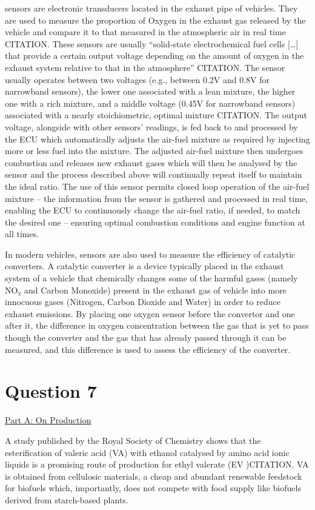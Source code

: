 \documentclass[11pt]{article}
\begin{document}
 sensors are electronic transducers located in the exhaust pipe of vehicles. They are used to measure the proportion of Oxygen in the exhaust gas released by the vehicle and compare it to that measured in the atmospheric air in real time CITATION. These sensors are usually “solid-state electrochemical fuel cells […] that provide a certain output voltage depending on the amount of oxygen in the exhaust system relative to that in the atmosphere” CITATION. The sensor usually operates between two voltages (e.g., between 0.2V and 0.8V for narrowband sensors), the lower one associated with a lean mixture, the higher one with a rich mixture, and a middle voltage (0.45V for narrowband sensors) associated with a nearly stoichiometric, optimal mixture CITATION. The output voltage, alongside with other sensors’ readings, is fed back to and processed by the ECU which automatically adjusts the air-fuel mixture as required by injecting more or less fuel into the mixture. The adjusted air-fuel mixture then undergoes combustion and releases new exhaust gases which will then be analysed by the  sensor and the process described above will continually repeat itself to maintain the ideal ratio. The use of this sensor permits closed loop operation of the air-fuel mixture – the information from the sensor is gathered and processed in real time, enabling the ECU to continuously change the air-fuel ratio, if needed, to match the desired one – ensuring optimal combustion conditions and engine function at all times.

In modern vehicles,  sensors are also used to measure the efficiency of catalytic converters. A catalytic converter is a device typically placed in the exhaust system of a vehicle that chemically changes some of the harmful gases (namely $\text{NO}_{\text{x}}$ and Carbon Monoxide) present in the exhaust gas of vehicle into more innocuous gases (Nitrogen, Carbon Dioxide and Water) in order to reduce exhaust emissions. By placing one oxygen sensor before the convertor and one after it, the difference in oxygen concentration between the gas that is yet to pass though the converter and the gas that has already passed through it can be measured, and this difference is used to assess the efficiency of the converter.
\section*{Question 7}
{\centering
  \underline{Part A: On Production}\par
}
A study published by the Royal Society of Chemistry shows that the esterification of valeric acid (VA) with ethanol catalysed by amino acid ionic liquids is a promising route of production for ethyl valerate (EV )CITATION. VA is obtained from cellulosic materials, a cheap and abundant renewable feedstock for biofuels which, importantly, does not compete with food supply like biofuels derived from starch-based plants.
\end{document}
